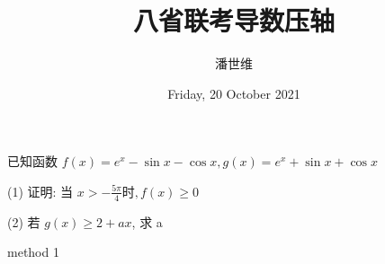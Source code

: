 \documentclass[a4paper,12pt]{article}
\begin{document}
\title {八省联考导数压轴}
\author{潘世维}
\date{Friday, 20 October 2021}
\maketitle

已知函数 $ f(x)=e^{x}-\sin x-\cos x, g(x)=e^{x}+\sin x+\cos x$


(1) 证明: 当 $ x>-\frac{5 \pi}{4}  时,  f(x) \geq 0 $



(2) 若 $ g(x) \geq 2+a x $, 求  a 

method 1
\end{document}
